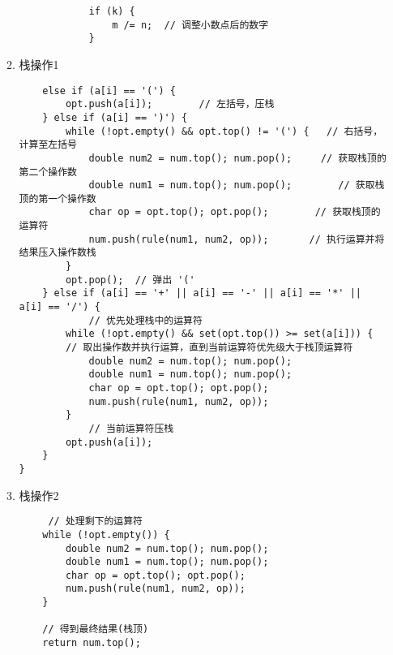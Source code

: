 \documentclass[a4paper]{article}
\begin{document}
\begin{enumerate}
\begin{enumerate}
\begin{lstlisting}
            if (k) {
                m /= n;  // 调整小数点后的数字
            }
        \end{lstlisting}
        \item 栈操作1
        \begin{lstlisting}
    else if (a[i] == '(') {
        opt.push(a[i]);        // 左括号，压栈
    } else if (a[i] == ')') {
        while (!opt.empty() && opt.top() != '(') {   // 右括号，计算至左括号
            double num2 = num.top(); num.pop();     // 获取栈顶的第二个操作数
            double num1 = num.top(); num.pop();        // 获取栈顶的第一个操作数
            char op = opt.top(); opt.pop();        // 获取栈顶的运算符
            num.push(rule(num1, num2, op));       // 执行运算并将结果压入操作数栈
        }
        opt.pop();  // 弹出 '('
    } else if (a[i] == '+' || a[i] == '-' || a[i] == '*' || a[i] == '/') {
            // 优先处理栈中的运算符
        while (!opt.empty() && set(opt.top()) >= set(a[i])) {     
        // 取出操作数并执行运算，直到当前运算符优先级大于栈顶运算符
            double num2 = num.top(); num.pop();
            double num1 = num.top(); num.pop();
            char op = opt.top(); opt.pop();
            num.push(rule(num1, num2, op));
        }
            // 当前运算符压栈
        opt.push(a[i]);
    }
}
        \end{lstlisting}
        \item 栈操作2
        \begin{lstlisting}
     // 处理剩下的运算符
    while (!opt.empty()) {
        double num2 = num.top(); num.pop();          
        double num1 = num.top(); num.pop();          
        char op = opt.top(); opt.pop();                    
        num.push(rule(num1, num2, op));
    }

    // 得到最终结果(栈顶)
    return num.top();
        \end{lstlisting}
    \end{enumerate}
\end{enumerate}
\end{document}

